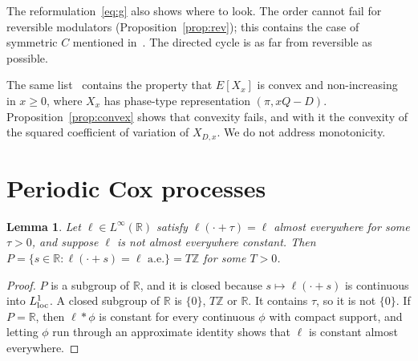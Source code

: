 \documentclass[11pt]{amsart}
\newtheorem{lemma}[theorem]{Lemma}
\theoremstyle{remark}
\newcommand{\R}{\mathbb R}
\begin{document}
The reformulation~\eqref{eq:g} also shows where to look. The order cannot fail for reversible modulators (Proposition~\ref{prop:rev}); this contains the case of symmetric $C$ mentioned in~\cite[Section~4]{AN}. The directed cycle is as far from reversible as possible.

The same list~\cite[Section~4.3]{He} contains the property that $E[X_x]$ is convex and non-increasing in $x\ge0$, where $X_x$ has phase-type representation $(\pi,xQ-D)$. Proposition~\ref{prop:convex} shows that convexity fails, and with it the convexity of the squared coefficient of variation of $X_{D,x}$. We do not address monotonicity.

\section{Periodic Cox processes}

\begin{lemma}\label{lem:period}
Let $\ell\in L^\infty(\R)$ satisfy $\ell(\cdot+\tau)=\ell$ almost everywhere for some $\tau>0$, and suppose $\ell$ is not almost everywhere constant. Then $P=\{s\in\R:\ell(\cdot+s)=\ell\text{ a.e.}\}=T\mathbb Z$ for some $T>0$.
\end{lemma}

\begin{proof}
$P$ is a subgroup of $\R$, and it is closed because $s\mapsto\ell(\cdot+s)$ is continuous into $L^1_{\rm loc}$. A closed subgroup of $\R$ is $\{0\}$, $T\mathbb Z$ or $\R$. It contains $\tau$, so it is not $\{0\}$. If $P=\R$, then $\ell*\phi$ is constant for every continuous $\phi$ with compact support, and letting $\phi$ run through an approximate identity shows that $\ell$ is constant almost everywhere.
\end{proof}
\end{document}
